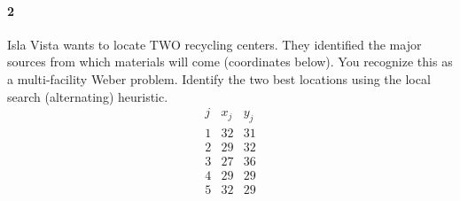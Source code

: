 \documentclass[12pt]{article}
\newenvironment{fullbox}{\begin{lrbox}{\savefullbox}\begin{minipage}{\dimexpr\textwidth-2\fboxsep\relax}}{\end{minipage}\end{lrbox}\begin{center}\framebox[\textwidth]{\usebox{\savefullbox}}\end{center}}
\newenvironment{pbox}[1][]{\begin{fullbox}\ifx#1\empty\else\paragraph{#1}\fi}{\end{fullbox}}
\theoremstyle{definition}
\begin{document}
\newpage
\begin{pbox}[2]
    Isla Vista wants to locate TWO recycling centers. They identified the major sources from which materials will come (coordinates below). You recognize this as a multi-facility Weber problem. Identify the two best locations using the local search (alternating) heuristic.
    \[\begin{array}{c|c|c}
        j & x_j & y_j \\
        \hline
        1 & 32 & 31 \\
        2 & 29 & 32 \\
        3 & 27 & 36 \\
        4 & 29 & 29 \\
        5 & 32 & 29
    \end{array}\]
\end{pbox}
\end{document}

